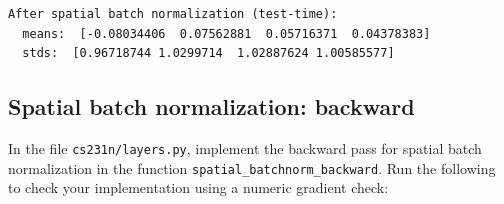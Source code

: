 \documentclass[11pt]{article}
\begin{document}
    \begin{Verbatim}[commandchars=\\\{\}]
After spatial batch normalization (test-time):
  means:  [-0.08034406  0.07562881  0.05716371  0.04378383]
  stds:  [0.96718744 1.0299714  1.02887624 1.00585577]

    \end{Verbatim}

    \subsection{Spatial batch normalization:
backward}\label{spatial-batch-normalization-backward}

In the file \texttt{cs231n/layers.py}, implement the backward pass for
spatial batch normalization in the function
\texttt{spatial\_batchnorm\_backward}. Run the following to check your
implementation using a numeric gradient check:
\end{document}
